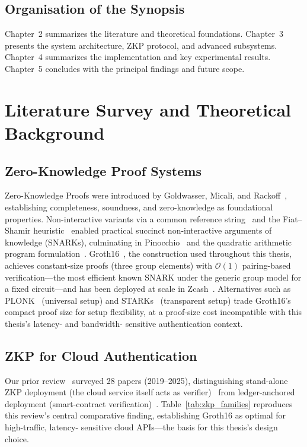 \documentclass[12pt,a4paper,oneside]{report}
\begin{document}
\section{Organisation of the Synopsis}

Chapter~2 summarizes the literature and theoretical foundations. Chapter~3
presents the system architecture, ZKP protocol, and advanced subsystems.
Chapter~4 summarizes the implementation and key experimental results.
Chapter~5 concludes with the principal findings and future scope.

\chapter{Literature Survey and Theoretical Background}

\section{Zero-Knowledge Proof Systems}

Zero-Knowledge Proofs were introduced by Goldwasser, Micali, and
Rackoff~\cite{goldreich94}, establishing completeness, soundness, and
zero-knowledge as foundational properties. Non-interactive variants via a
common reference string~\cite{bfm88} and the Fiat--Shamir
heuristic~\cite{fiatshamir} enabled practical succinct non-interactive
arguments of knowledge (SNARKs), culminating in Pinocchio~\cite{parno13}
and the quadratic arithmetic program formulation~\cite{gennaro13}.
Groth16~\cite{groth16}, the construction used throughout this thesis,
achieves constant-size proofs (three group elements) with
$\mathcal{O}(1)$ pairing-based verification---the most efficient known
SNARK under the generic group model for a fixed circuit---and has been
deployed at scale in Zcash~\cite{zcash14}. Alternatives such as
PLONK~\cite{plonk} (universal setup) and STARKs~\cite{starks} (transparent
setup) trade Groth16's compact proof size for setup flexibility, at a
proof-size cost incompatible with this thesis's latency- and bandwidth-
sensitive authentication context.

\section{ZKP for Cloud Authentication}

Our prior review~\cite{dandge2025zkpcloud} surveyed 28 papers (2019--2025),
distinguishing stand-alone ZKP deployment (the cloud service itself acts
as verifier)~\cite{khandait2024,pathak2021,butt2024} from ledger-anchored
deployment (smart-contract verification)~\cite{hou2022,verma2024,naidu2023}.
Table~\ref{tab:zkp_families} reproduces this review's central comparative
finding, establishing Groth16 as optimal for high-traffic, latency-
sensitive cloud APIs---the basis for this thesis's design choice.
\end{document}
